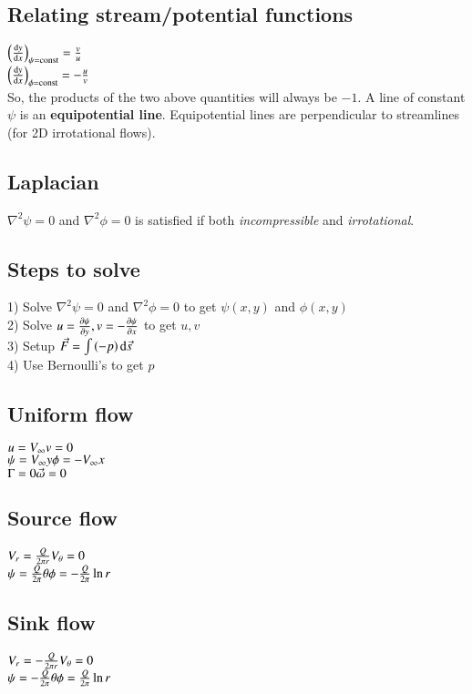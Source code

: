 \subsection*{Relating stream/potential functions}
$\left( \odv{y}{x} \right)_{\psi=\text{const}} =  \frac{v}{u}$\\
$\left( \odv{y}{x} \right)_{\phi=\text{const}} = -\frac{u}{v}$\\
So, the products of the two above quantities will always be $-1$. A line of constant $\psi$ is an \textbf{equipotential line}. Equipotential lines are perpendicular to streamlines (for 2D irrotational flows).
\subsection*{Laplacian}
$\nabla^2\psi=0$ and $\nabla^2\phi=0$ is satisfied if both \textit{incompressible} and \textit{irrotational}.
\subsection*{Steps to solve}
1) Solve $\nabla^2\psi=0$ and $\nabla^2\phi=0$ to get $\psi(x,y)$ and $\phi(x,y)$\\
2) Solve $u=\pdv{\psi}{y},v=-\pdv{\psi}{x}$ to get $u,v$\\
3) Setup $\vec{F}=\int\left(-p\right)\odif{\vec{s}}$\\
4) Use Bernoulli's to get $p$
\subsection*{Uniform flow}
$u=V_\infty\hfill v=0$\\
$\psi=V_\infty y\hfill \phi=-V_\infty x$\\
$\Gamma = 0\hfill\vec{\omega}=0$
\subsection*{Source flow}
$V_r=\frac{Q}{2\pi r}\hfill V_\theta=0$\\
$\psi=\frac{Q}{2\pi}\theta\hfill \phi=-\frac{Q}{2\pi}\ln r$
\subsection*{Sink flow}
$V_r=-\frac{Q}{2\pi r}\hfill V_\theta=0$\\
$\psi=-\frac{Q}{2\pi}\theta\hfill \phi=\frac{Q}{2\pi}\ln r$
